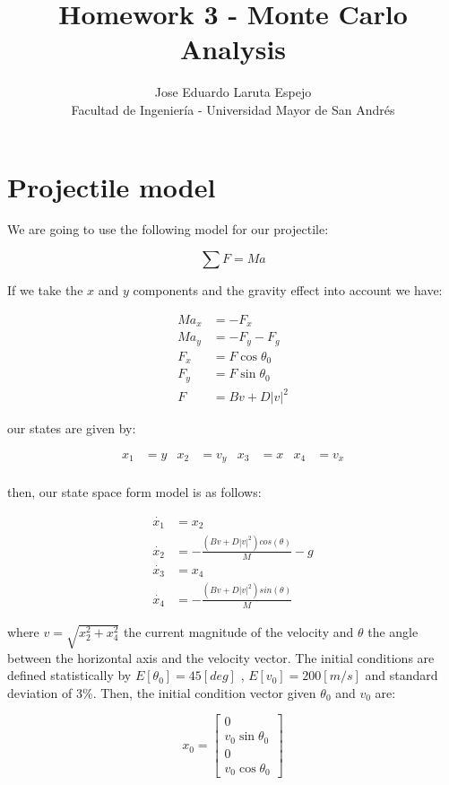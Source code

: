 \documentclass[12pt,letterpaper]{article}
\title{Homework 3 - Monte Carlo Analysis}
\author{Jose Eduardo Laruta Espejo \\ Facultad de Ingeniería - Universidad Mayor de San Andrés}
\begin{document}
\maketitle

\section{Projectile model}
We are going to use the following model for our projectile:

\begin{equation}
    \sum{F} = M a
\end{equation}

If we take the $x$ and $y$ components and the gravity effect into account we have:

\begin{align}
    M a_x &= -F_x \\ 
    M a_y &= -F_y - F_g \\ 
    F_x &= F\cos{\theta_0} \\
    F_y &= F\sin{\theta_0} \\
    F &= Bv + D|v|^2
\end{align}

our states are given by:

\begin{align*}
    x_1 &= y &x_2&=v_y &x_3&=x &x_4&=v_x\\
\end{align*}

then, our state space form model is as follows:

\begin{align}
    \dot{x_1} &= x_2 \\
    \dot{x_2} &= -\frac{(Bv + D|v|^2)cos(\theta)}{M} - g \\
    \dot{x_3} &= x_4 \\
    \dot{x_4} &= -\frac{(Bv + D|v|^2)sin(\theta)}{M}
\end{align}

where $v = \sqrt{x_2^2 + x_4^2}$ the current magnitude of the velocity and $\theta$ the angle between the horizontal 
axis and the velocity vector. The initial conditions are 
defined statistically by $E[\theta_0] = 45[deg]$ , $E[v_0]=200[m/s]$ and standard deviation of 3\%. Then, the initial condition vector 
given $\theta_0$ and $v_0$ are:

\begin{equation*}
    x_0 = \begin{bmatrix}
        0 \\
        v_0 \sin{\theta_0} \\
        0 \\
        v_0 \cos{\theta_0}
    \end{bmatrix}
\end{equation*}
\end{document}
